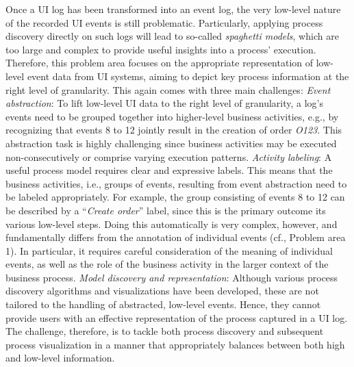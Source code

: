 Once a UI log has been transformed into an event log, the very low-level nature of the recorded UI events is still problematic. Particularly, applying process discovery directly on such logs will lead to so-called \emph{spaghetti models}, which are too large and complex to provide useful insights into a process' execution.
Therefore, this problem area focuses on the appropriate representation of low-level event data from UI systems, aiming to depict key process information at the right level of granularity. This again comes with three main challenges: 
\vspace{0.2em}
\newline%
\noindent\textit{Event abstraction}: To lift low-level UI data to the right level of granularity, a log's events need to be grouped together into higher-level business activities, e.g., by recognizing that events 8 to 12 jointly result in the creation of order \emph{O123}. This abstraction task is highly challenging since business activities may be executed non-consecutively or comprise varying execution patterns.
\vspace{0.2em}
\newline%
\noindent \textit{Activity labeling}: A useful process model requires clear and expressive labels. 
This means that the business activities, i.e., groups of events,  resulting from event abstraction need to be labeled appropriately. For example, the group consisting of events 8 to 12 can be described by a ``\textit{Create order}'' label, since this is the primary outcome its various low-level steps. Doing this automatically is very complex, however, and fundamentally differs from the annotation of individual events (cf., Problem area 1). In particular, it requires careful consideration of the meaning of individual events, as well as the role of the business activity in the larger context of the business process.
 \vspace{0.2em}
 \newline%
\noindent \textit{Model discovery and representation}: 
Although various process discovery algorithms and visualizations have been developed, these are not tailored to the handling of abstracted, low-level events. Hence, they cannot provide users with an effective representation of the process captured in a UI log.  The challenge, therefore, is to tackle both process discovery and  subsequent process visualization in a manner that appropriately balances between both high and low-level information.

